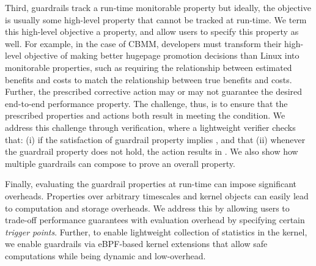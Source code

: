 Third, guardrails track a run-time monitorable property but ideally, the objective is usually some high-level property that cannot be tracked at run-time.
We term this high-level objective a \perfsafety property, and allow users to specify this property as well.
For example, in the case of CBMM, developers must transform their high-level objective of making better hugepage promotion decisions than Linux into monitorable properties, such as requiring the relationship between estimated benefits and costs to match the relationship between true benefits and costs.
Further, the prescribed corrective action may or may not guarantee the desired end-to-end performance property. 
The challenge, thus, is to ensure that the prescribed properties and actions both result in meeting the \perfsafety condition.
We address this challenge through verification, where a lightweight verifier checks that: (i) if the satisfaction of guardrail property implies \perfsafety, and that (ii) whenever the guardrail property does not hold, the action results in \perfsafety.
We also show how multiple guardrails can compose to prove an overall \perfsafety property.

Finally, evaluating the guardrail properties at run-time can impose significant overheads. Properties over arbitrary timescales and kernel objects can easily lead to computation and storage overheads.
We address this by allowing users to trade-off performance guarantees with evaluation overhead by specifying certain {\em trigger points}.
Further, to enable lightweight collection of statistics in the kernel, we enable guardrails via eBPF-based kernel extensions that allow safe computations while being dynamic and low-overhead.



